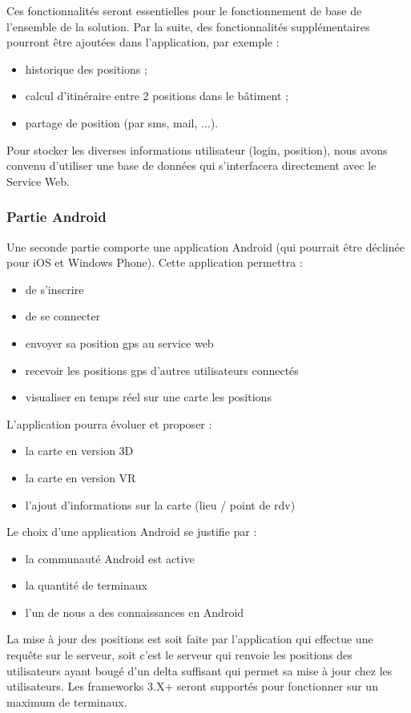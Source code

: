 Ces fonctionnalités seront essentielles pour le fonctionnement de base de l'ensemble de la solution. Par la suite, des fonctionnalités supplémentaires pourront être ajoutées dans l'application, par exemple :
\begin{itemize}
    \item historique des positions ;
    \item calcul d'itinéraire entre 2 positions dans le bâtiment ;
    \item partage de position (par sms, mail, ...).
\end{itemize}

Pour stocker les diverses informations utilisateur (login, position), nous avons convenu d'utiliser une base de données qui s'interfacera directement avec le Service Web.

\subsubsection{Partie Android}
Une seconde partie comporte une application Android (qui pourrait être déclinée pour iOS et Windows Phone). Cette application permettra :
\begin{itemize}
    \item de s'inscrire
    \item de se connecter
    \item envoyer sa position gps au service web
    \item recevoir les positions gps d'autres utilisateurs connectés
    \item visualiser en temps réel sur une carte les positions
\end{itemize}

L'application pourra évoluer et proposer :
\begin{itemize}
    \item la carte en version 3D
    \item la carte en version VR
    \item l'ajout d'informations sur la carte (lieu / point de rdv)
\end{itemize}

Le choix d'une application Android se justifie par :
\begin{itemize}
    \item la communauté Android est active
    \item la quantité de terminaux
    \item l'un de nous a des connaissances en Android
\end{itemize}
La mise à jour des positions est soit faite par l'application qui effectue une requête sur le serveur, soit c'est le serveur qui renvoie les positions des utilisateurs ayant bougé d'un delta suffisant qui permet sa mise à jour chez les utilisateurs. Les frameworks 3.X+ seront supportés pour fonctionner sur un maximum de terminaux.


